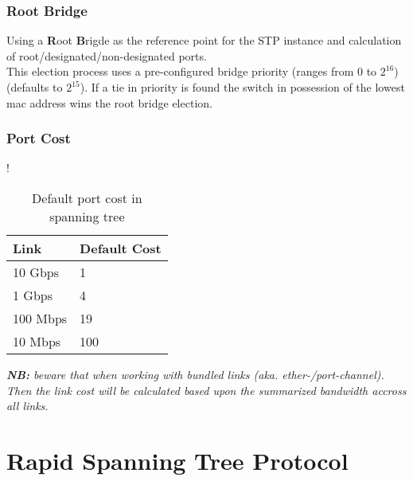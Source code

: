 \subsubsection{Root Bridge}
Using a \textbf{R}oot \textbf{B}rigde as the reference point for the STP instance and calculation of root/designated/non-designated ports.\\This election process uses a pre-configured bridge priority (ranges from $0$ to $2^{16}$) (defaults to $2^{15}$). If a tie in priority is found the switch in possession of the lowest mac address wins the root bridge election.


\subsubsection{Port Cost}

\begin{table}[h]
    \centering
    \caption{Default port cost in spanning tree}
    \label{stpportcost}{!}{%
        \begin{tabular}{|l|l|}
            \hline
            \textbf{Link} & \textbf{Default Cost} \\ \hline
            10 Gbps       & 1                     \\ \hline
            1 Gbps        & 4                     \\ \hline
            100 Mbps      & 19                    \\ \hline
            10 Mbps       & 100                   \\ \hline
        \end{tabular}%
    }
\end{table}


\textit{\textbf{NB:} beware that when working with bundled links (aka. ether-/port-channel). Then the link cost will be calculated based upon the summarized bandwidth accross all links.}


\section{Rapid Spanning Tree Protocol}



